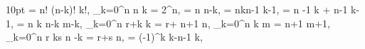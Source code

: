  10pt
 = {n! \over (n-k)! k!}, \Mf
\Fm \sum_{k=0}^n {n \choose k} = 2^n, \Mf
{} = {n \choose n-k}, \Mf
{} = {n\over k}{n-1 \choose k-1}, \Mf
{} = {n -1 \choose k} + {n-1 \choose k-1}, \Mf
{} = { n \choose k} { n-k \choose m-k}, \Mf
\Fm \sum_{k=0}^n {r+k \choose k} = { r+ n+1 \choose n}, \Mf
\Fm \sum_{k=0}^n {k \choose m} = { n+1 \choose m+1}, \Mf
\Fm \sum_{k=0}^n {r \choose k}{s \choose n -k} = {r+s \choose n}, \Mf
{} =  (-1)^k {k-n-1 \choose k}, \Mf
\EndDis
